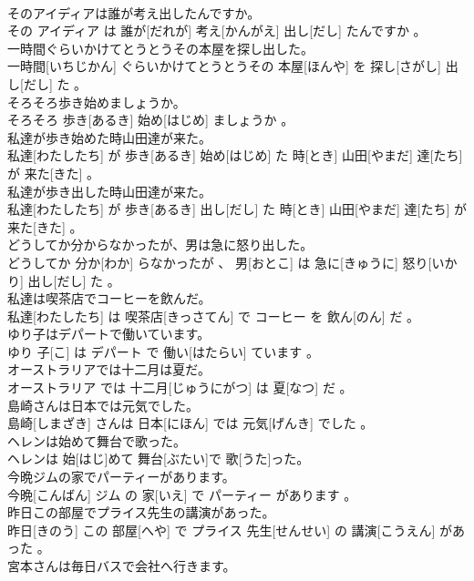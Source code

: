 \documentclass[8pt]{extreport}
\begin{document}
\begin{CJK}{UTF8}{min}
\\	そのアイディアは誰が考え出したんですか。	
\\	その アイディア は 誰が[だれが] 考え[かんがえ] 出し[だし] たんですか 。
\\	一時間ぐらいかけてとうとうその本屋を探し出した。	
\\	一時間[いちじかん] ぐらいかけてとうとうその 本屋[ほんや] を 探し[さがし] 出し[だし] た 。
\\	そろそろ歩き始めましょうか。	
\\	そろそろ 歩き[あるき] 始め[はじめ] ましょうか 。
\\	私達が歩き始めた時山田達が来た。	
\\	私達[わたしたち] が 歩き[あるき] 始め[はじめ] た 時[とき] 山田[やまだ] 達[たち] が 来た[きた] 。
\\	私達が歩き出した時山田達が来た。	
\\	私達[わたしたち] が 歩き[あるき] 出し[だし] た 時[とき] 山田[やまだ] 達[たち] が 来た[きた] 。
\\	どうしてか分からなかったが、男は急に怒り出した。	
\\	どうしてか 分か[わか] らなかったが 、 男[おとこ] は 急に[きゅうに] 怒り[いかり] 出し[だし] た 。
\\	私達は喫茶店でコーヒーを飲んだ。	
\\	私達[わたしたち] は 喫茶店[きっさてん] で コーヒー を 飲ん[のん] だ 。
\\	ゆり子はデパートで働いています。	
\\	ゆり 子[こ] は デパート で 働い[はたらい] ています 。
\\	オーストラリアでは十二月は夏だ。	
\\	オーストラリア では 十二月[じゅうにがつ] は 夏[なつ] だ 。
\\	島崎さんは日本では元気でした。	
\\	島崎[しまざき] さんは 日本[にほん] では 元気[げんき] でした 。
\\	ヘレンは始めて舞台で歌った。	
\\	ヘレンは 始[はじ]めて 舞台[ぶたい]で 歌[うた]った。
\\	今晩ジムの家でパーティーがあります。	
\\	今晩[こんばん] ジム の 家[いえ] で パーティー があります 。
\\	昨日この部屋でプライス先生の講演があった。	
\\	昨日[きのう] この 部屋[へや] で プライス 先生[せんせい] の 講演[こうえん] があった 。
\\	宮本さんは毎日バスで会社へ行きます。	

\end{CJK}
\end{document}

